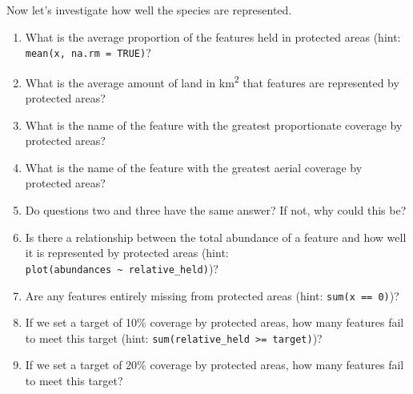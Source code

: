 \documentclass[12pt,]{book}
\providecommand{\tightlist}{%
  \setlength{\itemsep}{0pt}\setlength{\parskip}{0pt}}
\let\BeginKnitrBlock\begin \let\EndKnitrBlock\end
\begin{document}
Now let's investigate how well the species are represented.

\BeginKnitrBlock{rmdquestion}
\begin{enumerate}
\def\labelenumi{\arabic{enumi}.}
\tightlist
\item
  What is the average proportion of the features held in protected areas
  (hint: \texttt{mean(x,\ na.rm\ =\ TRUE)}?
\item
  What is the average amount of land in km\textsuperscript{2} that
  features are represented by protected areas?
\item
  What is the name of the feature with the greatest proportionate
  coverage by protected areas?
\item
  What is the name of the feature with the greatest aerial coverage by
  protected areas?
\item
  Do questions two and three have the same answer? If not, why could
  this be?
\item
  Is there a relationship between the total abundance of a feature and
  how well it is represented by protected areas (hint:
  \texttt{plot(abundances\ \textasciitilde{}\ relative\_held)})?
\item
  Are any features entirely missing from protected areas (hint:
  \texttt{sum(x\ ==\ 0)})?
\item
  If we set a target of 10\% coverage by protected areas, how many
  features fail to meet this target (hint:
  \texttt{sum(relative\_held\ \textgreater{}=\ target)})?
\item
  If we set a target of 20\% coverage by protected areas, how many
  features fail to meet this target?
\end{enumerate}
\EndKnitrBlock{rmdquestion}
\end{document}
